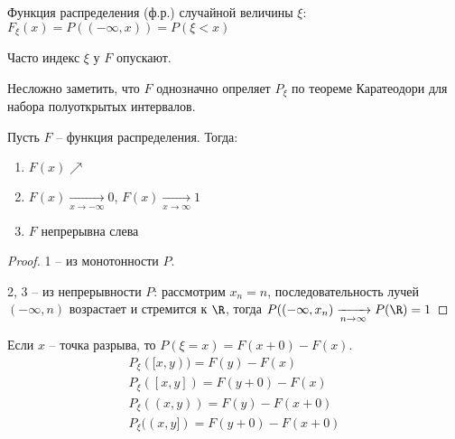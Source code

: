 \begin{Def}
Функция распределения (ф.р.) случайной величины $\xi$: $F_{\xi}(x) = P((-\infty, x)) = P(\xi < x)$
\end{Def}
\begin{Rem}
Часто индекс $\xi$ у $F$ опускают.
\end{Rem}

Несложно заметить, что $F$ однозначно опреляет $P_{\xi}$ по теореме Каратеодори для набора полуоткрытых интервалов.

\begin{theorem}

Пусть $F$ -- функция распределения. Тогда:

\begin{enumerate}
\item $F(x) \nearrow$
\item $F(x) \xrightarrow[x \to -\infty]{} 0$, $F(x) \xrightarrow[x \to \infty]{} 1$
\item $F$ непрерывна слева
\end{enumerate}
\end{theorem}
\begin{proof}
1 -- из монотонности $P$.

2, 3 -- из непрерывности $P$: рассмотрим $x_n = n$, последовательность лучей $(-\infty, n)$ возрастает и стремится к $\R$, тогда $P((-\infty, x_n) \xrightarrow[n \to \infty]{} P(\R) = 1$
\end{proof}

Если $x$ -- точка разрыва, то $P(\xi = x) = F(x + 0) - F(x)$.
\begin{gather*}
P_{\xi}([x, y)) = F(y) - F(x)\\
P_{\xi}([x, y]) = F(y + 0) - F(x)\\
P_{\xi}((x, y)) = F(y) - F(x + 0)\\
P_{\xi}((x, y]) = F(y + 0) - F(x + 0)
\end{gather*}

